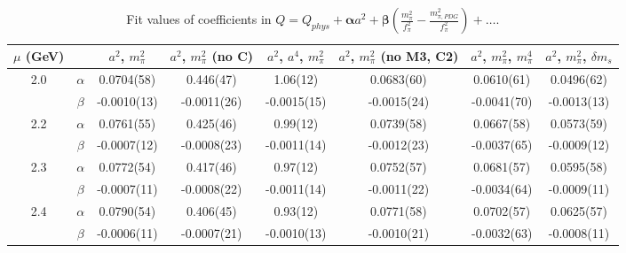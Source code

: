 \documentclass[12pt]{extarticle}
\begin{document}
\begin{table}[h!]
\begin{center}
\begin{tabular}{|c c|c|c|c|c|c|c|}
\hline
$\mu$ (GeV) &  & $a^2$, $m_\pi^2$& $a^2$, $m_\pi^2$ (no C)& $a^2$, $a^4$, $m_\pi^2$& $a^2$, $m_\pi^2$ (no M3, C2)& $a^2$, $m_\pi^2$, $m_\pi^4$& $a^2$, $m_\pi^2$, $\delta m_s$\\
\hline
\multirow{2}{0.5in}{2.0} & $\alpha$ & 0.0704(58)& 0.446(47)& 1.06(12)& 0.0683(60)& 0.0610(61)& 0.0496(62)\\
 & $\beta$ & -0.0010(13)& -0.0011(26)& -0.0015(15)& -0.0015(24)& -0.0041(70)& -0.0013(13)\\
\hline
\multirow{2}{0.5in}{2.2} & $\alpha$ & 0.0761(55)& 0.425(46)& 0.99(12)& 0.0739(58)& 0.0667(58)& 0.0573(59)\\
 & $\beta$ & -0.0007(12)& -0.0008(23)& -0.0011(14)& -0.0012(23)& -0.0037(65)& -0.0009(12)\\
\hline
\multirow{2}{0.5in}{2.3} & $\alpha$ & 0.0772(54)& 0.417(46)& 0.97(12)& 0.0752(57)& 0.0681(57)& 0.0595(58)\\
 & $\beta$ & -0.0007(11)& -0.0008(22)& -0.0011(14)& -0.0011(22)& -0.0034(64)& -0.0009(11)\\
\hline
\multirow{2}{0.5in}{2.4} & $\alpha$ & 0.0790(54)& 0.406(45)& 0.93(12)& 0.0771(58)& 0.0702(57)& 0.0625(57)\\
 & $\beta$ & -0.0006(11)& -0.0007(21)& -0.0010(13)& -0.0010(21)& -0.0032(63)& -0.0008(11)\\
\hline
\end{tabular}
\caption{Fit values of coefficients in $Q = Q_{phys} + \mathbf{\alpha} a^2 + \mathbf{\beta}\left(\frac{m_\pi^2}{f_\pi^2}-\frac{m_{\pi,PDG}^2}{f_\pi^2}\right) + \ldots$.}
\end{center}
\end{table}
























\clearpage
\end{document}
